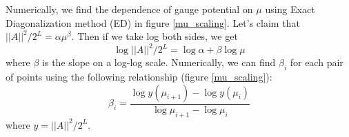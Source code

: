 \documentclass[11pt,a4paper]{article}
\begin{document}
Numerically, we find the dependence of gauge potential on $\mu$ using Exact Diagonalization method (ED) in figure \ref{mu_scaling}. Let's claim that $||A||^2/2^L=\alpha\mu^{\beta}$. Then if we take log both sides, we get
\begin{equation}
\log ||A||^2/2^L=\log \alpha+ \beta \log \mu
\end{equation}
where $\beta$ is the slope on a log-log scale. Numerically, we can find $\beta_i$ for each pair of points using the following relationship (figure \ref{mu_scaling}):
\begin{equation}
\beta_i=\dfrac{\log y( \mu_{i+1}) -\log y( \mu_{i})} {\log \mu_{i+1}-\log \mu_{i}}
\end{equation}
where $y= ||A||^2/2^L$. 
\end{document}
